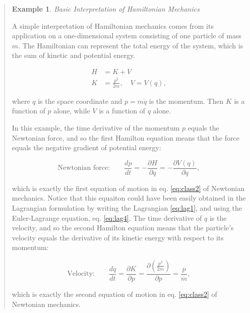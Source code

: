 \documentclass[
  9pt,
]{extbook}
\theoremstyle{definition}
\theoremstyle{definition}
\newtheorem{example}{Example}[chapter]
\theoremstyle{definition}
\theoremstyle{remark}
\begin{document}
\begin{quote}
\begin{example}
\protect\hypertarget{exm:hamex1}{}{\label{exm:hamex1} }\emph{Basic Interpretation of Hamiltonian Mechanics}

A simple interpretation of Hamiltonian mechanics comes from its application on a one-dimensional system consisting of one particle of mass \(m\). The Hamiltonian can represent the total energy of the system, which is the sum of kinetic and potential energy.

\begin{equation}
\begin{aligned}
H &= K+V \\
K &={\frac {p^{2}}{2m}},\quad V=V(q),
\end{aligned}
\label{eq:ham4}
\end{equation}

where \(q\) is the space coordinate and \(p=m\dot{q}\) is the momentum. Then
\(K\) is a function of \(p\) alone, while \(V\) is a function of \(q\) alone.

In this example, the time derivative of the momentum \(p\) equals the Newtonian force, and so the first Hamilton equation means that the force equals the negative gradient of potential energy:

\begin{equation}
\text{Newtonian force:}\qquad \frac{dp}{dt} = -\frac{\partial H}{\partial q}= -\frac{\partial V(q)}{\partial q},
\label{eq:ham5}
\end{equation}

which is exactly the first equation of motion in eq. \eqref{eq:class2} of Newtonian mechanics. Notice that this equaiton could have been easily obtained in the Lagrangian formulation by writing the Lagrangian \eqref{eq:lag1}, and using the Euler-Lagrange equation, eq. \eqref{eq:lag4}.
The time derivative of \(q\) is the velocity, and so the second Hamilton equation means that the particle's velocity equals the derivative of its kinetic energy with respect to its momentum:

\begin{equation}
\text{Velocity:}\qquad \frac{dq}{dt} = \frac{\partial K}{\partial p} = \frac{\partial \left(\frac{p^2}{2m}\right)}{\partial p} = \frac{p}{m},
\label{eq:ham6}
\end{equation}

which is exactly the second equation of motion in eq. \eqref{eq:class2} of Newtonian mechanics.
\end{example}
\end{quote}
\end{document}
